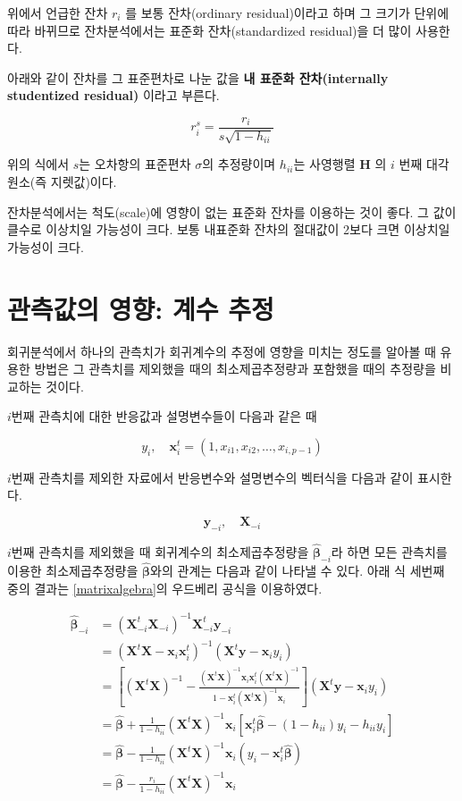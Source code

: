 \documentclass[
]{book}
\theoremstyle{definition}
\theoremstyle{definition}
\theoremstyle{definition}
\theoremstyle{definition}
\theoremstyle{remark}
\begin{document}
위에서 언급한 잔차 \(r_i\) 를 보통 잔차(ordinary residual)이라고 하며 그
크기가 단위에 따라 바뀌므로 잔차분석에서는 표준화 잔차(standardized
residual)을 더 많이 사용한다.

아래와 같이 잔차를 그 표준편차로 나눈 값을 \textbf{내 표준화 잔차(internally
studentized residual)} 이라고 부른다.

\begin{equation}
r^s_i = \frac{r_i}{s \sqrt{1-h_{ii}}} 
\label{eq:residinternal}
\end{equation}

위의 식에서 \(s\)는 오차항의 표준편차 \(\sigma\)의 추정량이며 \(h_{ii}\)는
사영행렬 \(\bm H\) 의 \(i\) 번째 대각원소(즉 지렛값)이다.

잔차분석에서는 척도(scale)에 영향이 없는 표준화 잔차를 이용하는 것이
좋다. 그 값이 클수로 이상치일 가능성이 크다. 보통 내표준화 잔차의
절대값이 2보다 크면 이상치일 가능성이 크다.

\hypertarget{uxad00uxce21uxac12uxc758-uxc601uxd5a5-uxacc4uxc218-uxcd94uxc815}{%
\section{관측값의 영향: 계수 추정}\label{uxad00uxce21uxac12uxc758-uxc601uxd5a5-uxacc4uxc218-uxcd94uxc815}}

회귀분석에서 하나의 관측치가 회귀계수의 추정에 영향을 미치는 정도를
알아볼 때 유용한 방법은 그 관측치를 제외했을 때의 최소제곱추정량과
포함했을 때의 추정량을 비교하는 것이다.

\(i\)번째 관측치에 대한 반응값과 설명변수들이 다음과 같은 때

\[ y_i, \quad \bm x_{i}^t=(1, x_{i1},x_{i2},\dots, x_{i,p-1}) \]

\(i\)번째 관측치를 제외한 자료에서 반응변수와 설명변수의 벡터식을 다음과
같이 표시한다.

\[ \bm y_{-i}, \quad \bm X_{-i} \]

\(i\)번째 관측치를 제외했을 때 회귀계수의 최소제곱추정량을
\(\hat{ \bm \beta}_{-i}\)라 하면 모든 관측치를 이용한 최소제곱추정량을
\(\hat{ \bm \beta}\)와의 관계는 다음과 같이 나타낼 수 있다. 아래 식 세번째
중의 결과는 \ref{matrixalgebra}의 우드베리 공식을 이용하였다.

\begin{align}
\hat{ \bm \beta}_{-i} & =  (\bm X_{-i}^t \bm X_{-i})^{-1} \bm X_{-i}^t \bm y_{-i}\\
& = (\bm X^t \bm X - \bm x_{i} \bm x_{i}^t)^{-1} (\bm X^t \bm y -  \bm x_{i} y_{i}) \\
& = \left [ (\bm X^t \bm X)^{-1} - \frac { (\bm X^t \bm X)^{-1}  \bm x_{i} \bm x_{i}^t
  (\bm X^t \bm X)^{-1}  }{ 1- \bm x_{i}^t (\bm X^t \bm X)^{-1}  \bm x_{i} } \right ]
(\bm X^t \bm y -  \bm x_{i} y_{i})  \\
& = \hat{ \bm \beta} + \frac{1}{1-h_{ii}} (\bm X^t \bm X)^{-1}  \bm x_i \left [ \bm x_i^t \hat{ \bm \beta} - (1-h_{ii}) y_i - h_{ii} y_i \right ] \\
& =  \hat{ \bm \beta} - \frac{1}{1-h_{ii}} (\bm X^t \bm X)^{-1}  \bm x_i ( y_i - \bm x_i^t \hat{ \bm \beta}) \\
& =  \hat{ \bm \beta} - \frac{r_i}{1-h_{ii}} (\bm X^t \bm X)^{-1}  \bm x_i 
\label{eq:betaminusi}
\end{align}
\end{document}
